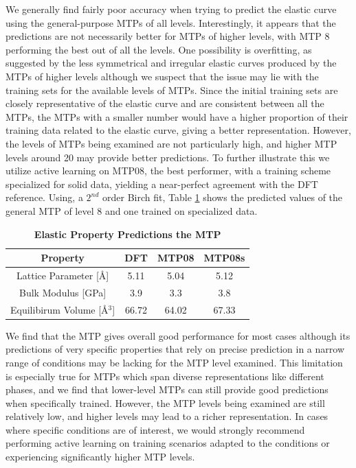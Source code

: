 \documentclass[9pt,twocolumn,twoside]{opticajnl}
\begin{document}
We generally find fairly poor accuracy when trying to predict the elastic curve using the general-purpose MTPs of all levels. Interestingly, it appears that the predictions are not necessarily better for MTPs of higher levels, with MTP 8 performing the best out of all the levels. One possibility is overfitting, as suggested by the less symmetrical and irregular elastic curves produced by the MTPs of higher levels although we suspect that the issue may lie with the training sets for the available levels of MTPs. Since the initial training sets are closely representative of the elastic curve and are consistent between all the MTPs, the MTPs with a smaller number would have a higher proportion of their training data related to the elastic curve, giving a better representation. However, the levels of MTPs being examined are not particularly high, and higher MTP levels around 20 may provide better predictions. To further illustrate this we utilize active learning on MTP08, the best performer, with a training scheme specialized for solid data, yielding a near-perfect agreement with the DFT reference. Using, a $2^{nd}$ order Birch fit, Table \ref{tab:elastic} shows the predicted values of the general MTP of level 8 and one trained on specialized data. 

\begin{table}[htbp]
  \centering
  \caption{\bf Elastic Property Predictions the MTP}
  \begin{tabular}{cccc}
  \hline
  Property & DFT &  MTP08 & MTP08s\\ 
  \hline
  Lattice Parameter [Å] & 5.11 & 5.04 & 5.12\\
  Bulk Modulus [GPa]& 3.9 & 3.3 & 3.8\\
  Equilibirum Volume [Å$^3$]& 66.72 & 64.02 & 67.33\\
  \hline
  \end{tabular}
  \label{tab:elastic}
\end{table}

We find that the MTP gives overall good performance for most cases although its predictions of very specific properties that rely on precise prediction in a narrow range of conditions may be lacking for the MTP level examined. This limitation is especially true for MTPs which span diverse representations like different phases, and we find that lower-level MTPs can still provide good predictions when specifically trained. However, the MTP levels being examined are still relatively low, and higher levels may lead to a richer representation. In cases where specific conditions are of interest, we would strongly recommend performing active learning on training scenarios adapted to the conditions or experiencing significantly higher MTP levels.
\end{document}
